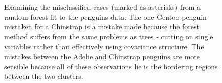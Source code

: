 \documentclass[
  letterpaper,
]{krantz}
\begin{document}
\begin{figure}

\begin{minipage}{0.50\linewidth}



\end{minipage}%
%
\begin{minipage}{0.50\linewidth}



\end{minipage}%

\caption{\label{fig-p-errors-pdf}Examining the misclassified cases
(marked as asterisks) from a random forest fit to the penguins data. The
one Gentoo penguin mistaken for a Chinstrap is a mistake made because
the forest method suffers from the same problems as trees - cutting on
single variables rather than effectively using covariance structure. The
mistakes between the Adelie and Chinstrap penguins are more sensible
because all of these observations lie is the bordering regions between
the two clusters.}

\end{figure}%
\end{document}
